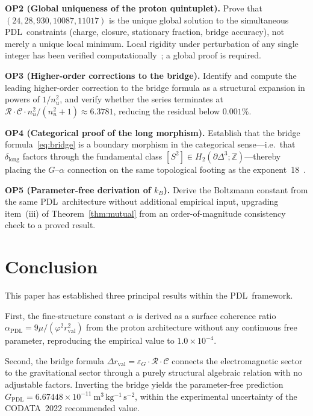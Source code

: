 \documentclass[11pt,a4paper]{article}
\theoremstyle{definition}
\newcommand{\PDL}{\textnormal{PDL}}
\newcommand{\rval}{r_{\mathrm{val}}}
\newcommand{\epsg}{\varepsilon_G}
\newcommand{\alphaPDL}{\alpha_{\mathrm{PDL}}}
\newcommand{\GPDL}{G_{\mathrm{PDL}}}
\newcommand{\calR}{\mathcal{R}}
\newcommand{\calC}{\mathcal{C}}
\newcommand{\vp}{\varphi}
\newcommand{\drval}{\Delta r_{\mathrm{val}}}
\begin{document}
\medskip\noindent\textbf{OP2 (Global uniqueness of the proton quintuplet).} Prove that $(24, 28, 930, 10087, 11017)$ is the unique global solution to the simultaneous \PDL\ constraints (charge, closure, stationary fraction, bridge accuracy), not merely a unique local minimum. Local rigidity under perturbation of any single integer has been verified computationally~\cite{Combinatorial_Proton_v2_2026}; a global proof is required.

\medskip\noindent\textbf{OP3 (Higher-order corrections to the bridge).} Identify and compute the leading higher-order correction to the bridge formula as a structural expansion in powers of $1/n_u^2$, and verify whether the series terminates at $\calR\cdot\calC\cdot n_u^2/(n_u^2+1) \approx 6.3781$, reducing the residual below $0.001\%$.

\medskip\noindent\textbf{OP4 (Categorical proof of the long morphism).} Establish that the bridge formula~\eqref{eq:bridge} is a boundary morphism in the categorical sense---i.e.\ that $\delta_{\mathrm{long}}$ factors through the fundamental class $[S^2] \in H_2(\partial\Delta^3;\mathbb{Z})$---thereby placing the $G$--$\alpha$ connection on the same topological footing as the exponent~18~\cite{Topology_18_PDL_2026}.

\medskip\noindent\textbf{OP5 (Parameter-free derivation of $k_B$).} Derive the Boltzmann constant from the same \PDL\ architecture without additional empirical input, upgrading item~(iii) of Theorem~\ref{thm:mutual} from an order-of-magnitude consistency check to a proved result.

\section*{Conclusion}

This paper has established three principal results within the \PDL\ framework.

First, the fine-structure constant $\alpha$ is derived as a surface coherence ratio $\alphaPDL = 9\mu/(\vp^2\rval^2)$ from the proton architecture without any continuous free parameter, reproducing the empirical value to $1.0 \times 10^{-4}$.

Second, the bridge formula $\drval = \epsg\cdot\calR\cdot\calC$ connects the electromagnetic sector to the gravitational sector through a purely structural algebraic relation with no adjustable factors. Inverting the bridge yields the parameter-free prediction $\GPDL = 6.67448 \times 10^{-11}\ \mathrm{m^3\,kg^{-1}\,s^{-2}}$, within the experimental uncertainty of the CODATA~2022 recommended value.
\end{document}
